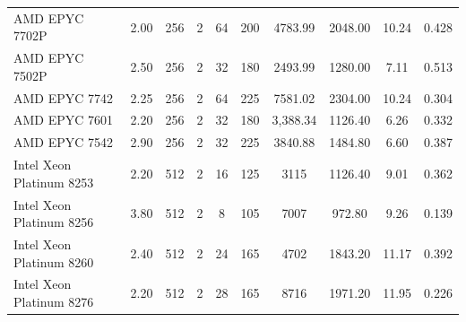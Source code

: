 \begin{table}[H]
\begin{adjustwidth}{-1.0in}{-1.0in}
\begin{center}
{\begin{tabular}{l||c|c|c|c|c|c|c|c|c}
\rowcolor[HTML]{EFEFEF} 
AMD EPYC 7702P            & 2.00       & 256                                                       & 2                                                        & 64    & 200   & 4783.99    & 2048.00       & 10.24       & 0.428         \\
AMD EPYC 7502P            & 2.50       & 256                                                       & 2                                                        & 32    & 180   & 2493.99    & 1280.00       & 7.11        & 0.513         \\
\rowcolor[HTML]{EFEFEF} 
AMD EPYC 7742             & 2.25       & 256                                                       & 2                                                        & 64    & 225   & 7581.02    & 2304.00       & 10.24       & 0.304         \\
AMD EPYC 7601             & 2.20       & 256                                                       & 2                                                        & 32    & 180   & 3,388.34   & 1126.40       & 6.26        & 0.332         \\
\rowcolor[HTML]{EFEFEF} 
AMD EPYC 7542             & 2.90       & 256                                                       & 2                                                        & 32    & 225   & 3840.88    & 1484.80       & 6.60        & 0.387         \\ \hline
Intel Xeon Platinum 8253  & 2.20       & 512                                                       & 2                                                        & 16    & 125   & 3115       & 1126.40       & 9.01        & 0.362         \\
\rowcolor[HTML]{EFEFEF} 
Intel Xeon Platinum 8256  & 3.80       & 512                                                       & 2                                                        & 8     & 105   & 7007       & 972.80        & 9.26        & 0.139         \\
Intel Xeon Platinum 8260  & 2.40       & 512                                                       & 2                                                        & 24    & 165   & 4702       & 1843.20       & 11.17       & 0.392         \\
\rowcolor[HTML]{EFEFEF} 
Intel Xeon Platinum 8276  & 2.20       & 512                                                       & 2                                                        & 28    & 165   & 8716       & 1971.20       & 11.95       & 0.226         \\

\end{tabular}}
\end{center}
\end{adjustwidth}
\end{table}
